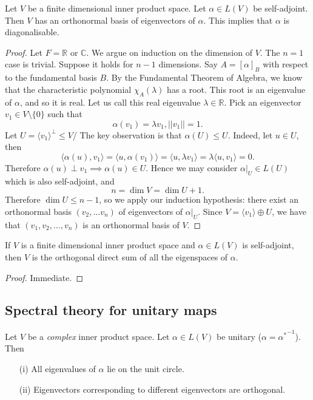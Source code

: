 \documentclass[a4paper]{scrartcl}
\begin{document}
\begin{theorem}
      Let $V$ be a finite dimensional inner product space. Let $\alpha \in L (V)$ be self-adjoint. Then $V$ has an orthonormal basis of eigenvectors of $\alpha$. This implies that $\alpha$ is diagonalisable.
\end{theorem}
\begin{proof}
      Let $F=\mathbb{R}$ or $\mathbb{C}$. We argue on induction on the dimension of $V$. The $n=1$ case is trivial. Suppose it holds for $n-1$ dimensions. Say $A=[\alpha]_B$ with respect to the fundamental basis $B$. By the Fundamental Theorem of Algebra, we know that the characteristic polynomial $\chi_A (\lambda)$ has a root. This root is an eigenvalue of $\alpha$, and so it is real. Let us call this real eigenvalue $\lambda \in \mathbb{R}$. Pick an eigenvector $v_1 \in V \setminus \{0\}$ such that 
      \[\alpha (v_1)= \lambda v_1, ||v_1||=1.\]
      Let $U=\langle v_1 \rangle^\perp \leq V$/
      The key observation is that $\alpha (U) \leq U$. Indeed, let $u \in U$, then 
      \[\langle \alpha (u), v_1 \rangle =\langle u,\alpha (v_1) \rangle =\langle u, \lambda v_1 \rangle =\lambda \langle u,v_1 \rangle =0.\]
      Therefore $\alpha (u)\perp v_1 \implies \alpha (u) \in U$. Hence we may consider $\alpha|_U \in L (U)$ which is also self-adjoint, and 
      \[n=\operatorname{dim}V=\operatorname{dim}U+1.\]
      Therefore $\operatorname{dim}U \leq n-1$, so we apply our induction hypothesis: there exist an orthonormal basis $(v_2,\ldots v_n)$ of eigenvectors of $\alpha|_U$. Since $V=\langle v_1 \rangle \oplus U$, we have that $(v_1,v_2, \ldots , v_n)$ is an orthonormal basis of $V$.
\end{proof}
\begin{corollary}
     If $V$ is a finite dimensional inner product space and $\alpha \in L (V)$ is self-adjoint, then $V$ is the orthogonal direct sum of all the eigenspaces of $\alpha$.
\end{corollary}
\begin{proof}
      Immediate.
\end{proof}

\subsection{Spectral theory for unitary maps}
\begin{lemma}
      Let $V$ be a \emph{complex} inner product space. Let $\alpha \in L (V)$ be unitary ($\alpha={\alpha^*}^{-1}$). Then
      \begin{itemize}
           \item[(i)]All eigenvalues of $\alpha$ lie on the unit circle.
           \item[(ii)]Eigenvectors corresponding to different eigenvectors are orthogonal. 
      \end{itemize}
\end{lemma}
\end{document}
